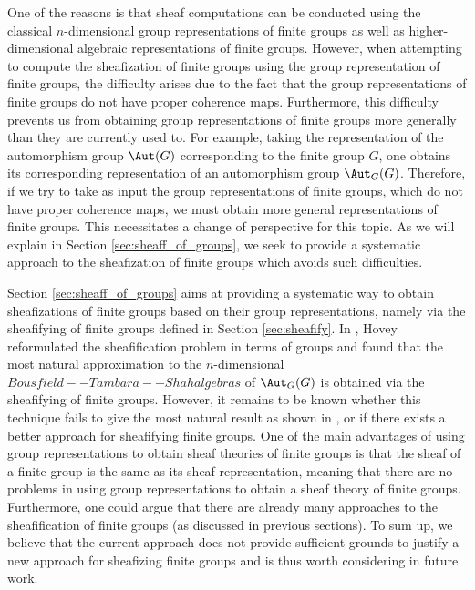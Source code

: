\documentclass[a4paper,reqno,oneside]{article}
\begin{document}
One of the reasons is that sheaf computations can be conducted using the classical $n$-dimensional group representations of finite groups as well as higher-dimensional algebraic representations of finite groups. However, when attempting to compute the sheafization of finite groups using the group representation of finite groups, the difficulty arises due to the fact that the group representations of finite groups do not have proper coherence maps. Furthermore, this difficulty prevents us from obtaining group representations of finite groups more generally than they are currently used to. For example, taking the representation of the automorphism group $\Aut(G)$ corresponding to the finite group $G$, one obtains its corresponding representation of an automorphism group $\Aut_G(G)$. Therefore, if we try to take as input the group representations of finite groups, which do not have proper coherence maps, we must obtain more general representations of finite groups. This necessitates a change of perspective for this topic. As we will explain in Section \ref{sec:sheaff_of_groups}, we seek to provide a systematic approach to the sheafization of finite groups which avoids such difficulties. 



Section \ref{sec:sheaff_of_groups} aims at providing a systematic way to obtain sheafizations of finite groups based on their group representations, namely via the sheafifying of finite groups defined in Section \ref{sec:sheafify}. In \cite{Hovey1996b}, Hovey reformulated the sheafification problem in terms of groups and found that the most natural approximation to the $n$-dimensional $Bousfield--Tambara--Shah algebras$ of $\Aut_G(G)$ is obtained via the sheafifying of finite groups. However, it remains to be known whether this technique fails to give the most natural result as shown in \cite{Hovey1996b}, or if there exists a better approach for sheafifying finite groups. One of the main advantages of using group representations to obtain sheaf theories of finite groups is that the sheaf of a finite group is the same as its sheaf representation, meaning that there are no problems in using group representations to obtain a sheaf theory of finite groups. Furthermore, one could argue that there are already many approaches to the sheafification of finite groups (as discussed in previous sections). To sum up, we believe that the current approach does not provide sufficient grounds to justify a new approach for sheafizing finite groups and is thus worth considering in future work.  
\end{document}
